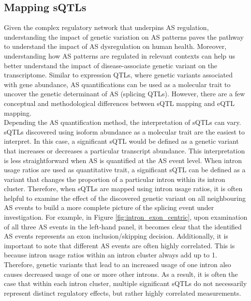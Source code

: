 \subsection{Mapping sQTLs}

Given the complex regulatory network that underpins AS regulation, understanding the impact of genetic variation on AS patterns paves the pathway to understand the impact of AS dysregulation on human health. Moreover, understanding how AS patterns are regulated in relevant contexts can help us better understand the impact of disease-associate genetic variant on the transcriptome. Similar to expression QTLs, where genetic variants associated with gene abundance, AS quantifications can be used as a molecular trait to uncover the genetic determinant of AS (splicing QTLs). However, there are a few conceptual and methodological differences between sQTL mapping and eQTL mapping. \\

Depending the AS quantification method, the interpretation of sQTLs can vary. sQTLs discovered using isoform abundance as a molecular trait are the easiest to interpret. In this case, a significant sQTL would be defined as a genetic variant that increases or decreases a particular transcript abundance. This interpretation is less straightforward when AS is quantified at the AS event level. When intron usage ratios are used as quantitative trait, a significant sQTL can be defined as a variant that changes the proportion of a particular intron within its intron cluster. Therefore, when sQTLs are mapped using intron usage ratios, it is often helpful to examine the effect of the discovered genetic variant on all neighbouring AS events to build a more complete picture of the splicing event under investigation. For example, in Figure \ref{fig:intron_exon_centric}, upon examination of all three AS events in the left-hand panel, it becomes clear that the identified AS events represents an exon inclusion/skipping decision. Additionally, it is important to note that different AS events are often highly correlated. This is because intron usage ratios within an intron cluster always add up to 1. Therefore, genetic variants that lead to an increased usage of one intron also causes decreased usage of one or more other introns. As a result, it is often the case that within each intron cluster, multiple significant sQTLs do not necessarily represent distinct regulatory effects, but rather highly correlated measurements. 


